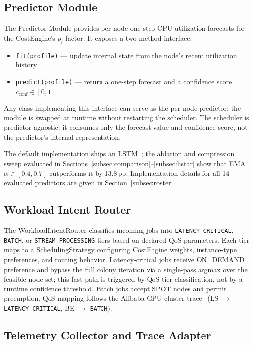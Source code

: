 \documentclass[conference]{IEEEtran}
\begin{document}
\subsection{Predictor Module}

The Predictor Module provides per-node one-step CPU utilization forecasts
for the CostEngine's $p_i$ factor. It exposes a two-method interface:

\begin{itemize}
  \item \texttt{fit(profile)} --- update internal state from the node's
        recent utilization history
  \item \texttt{predict(profile)} --- return a one-step forecast and a
        confidence score $c_{\text{conf}} \in [0,1]$
\end{itemize}

Any class implementing this interface can serve as the per-node predictor;
the module is swapped at runtime without restarting the scheduler. The
scheduler is predictor-agnostic: it consumes only the forecast value and
confidence score, not the predictor's internal representation.

The default implementation ships an LSTM~\cite{hochreiter1997lstm}; the
ablation and compression sweep evaluated in
Sections~\ref{subsec:comparison}--\ref{subsec:hstar} show that
EMA $\alpha \in [0.4, 0.7]$ outperforms it by 13.8\,pp.
Implementation details for all 14 evaluated predictors are given in
Section~\ref{subsec:roster}.

\subsection{Workload Intent Router}

The WorkloadIntentRouter classifies incoming jobs into
\texttt{LATENCY\_CRITICAL}, \texttt{BATCH}, or \texttt{STREAM\_PROCESSING}
tiers based on declared QoS parameters. Each tier maps to a
SchedulingStrategy configuring CostEngine weights, instance-type
preferences, and routing behavior. Latency-critical jobs receive
ON\_DEMAND preference and bypass the full colony iteration via a
single-pass argmax over the feasible node set; this fast path is triggered
by QoS tier classification, not by a runtime confidence threshold. Batch
jobs accept SPOT nodes and permit preemption. QoS mapping follows the
Alibaba GPU cluster trace~\cite{weng2023beware} (LS $\to$
\texttt{LATENCY\_CRITICAL}, BE $\to$ \texttt{BATCH}).

\subsection{Telemetry Collector and Trace Adapter}
\end{document}
